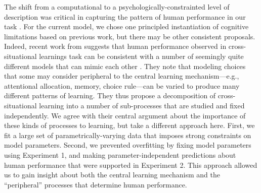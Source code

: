 \documentclass[man,floatsintext]{apa6}
\begin{document}
The shift from a computational to a psychologically-constrainted level of description was critical in capturing the pattern of human performance in our task \cite{Marr1982,Frank2010a,Yurovsky2012c}. For the current model, we chose one principled instantiation of cognitive limitations based on previous work, but there may be other consistent proposals. Indeed, recent work from  suggests that human performance observed in cross-situational learnings task can be consistent with a number of seemingly quite different models that can mimic each other \cite<see also>{Townsend1990,Townsend2004}. They note that modeling choices that some may consider peripheral to the central learning mechanism---e.g., attentional allocation, memory, choice rule---can be varied to produce many different patterns of learning. They thus propose a decomposition of cross-situational learning into a number of sub-processes that are studied and fixed independently. We agree with their central argument about the importance of these kinds of processes to learning, but take a different approach here. First, we fit a large set of parametrically-varying data that imposes strong constraints on model parameters. Second, we prevented overfitting by fixing model parameters using Experiment 1, and making parameter-independent predictions about human performance that were supported in Experiment 2. This approach allowed us to gain insight about both the central learning mechanism and the ``peripheral'' processes that determine human performance.


\end{document}
